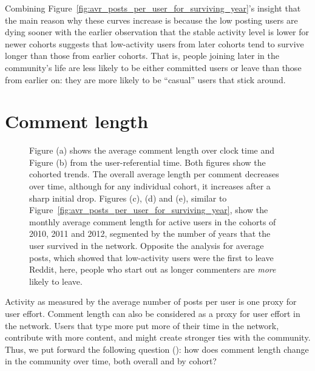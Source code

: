 Combining Figure~\ref{fig:avr_posts_per_user_for_surviving_year}'s insight that the main reason why these curves increase is because the low posting users are dying sooner with the earlier observation that the stable activity level is lower for newer cohorts suggests that low-activity users from later cohorts tend to survive longer than those from earlier cohorts.  That is, people joining later in the community's life are less likely to be either committed users or leave than those from earlier on: they are more likely to be ``casual'' users that stick around.

\vspace{7pt} 
\section{Comment length}

\begin{figure}[!tb]
\centering
{}
\caption{Figure (a) shows the average comment length over clock time and Figure (b) from the user-referential time. Both figures show the cohorted trends.  The overall average length per comment decreases over time, although for any individual cohort, it increases after a sharp initial drop. Figures (c), (d) and (e), similar to Figure~\ref{fig:avr_posts_per_user_for_surviving_year}, show the monthly average comment length for active users in the cohorts of 2010, 2011 and 2012, segmented by the number of years that the user survived in the network.  Opposite the analysis for average posts, which showed that low-activity users were the first to leave Reddit, here, people who start out as longer commenters are \textit{more} likely to leave.}
\label{fig:comment_length}
\end{figure}

Activity as measured by the average number of posts per user is one proxy for user effort.  Comment length can also be considered as a proxy for user effort in the network.  Users that type more put more of their time in the network, contribute with more content, and might create stronger ties with the community. Thus, we put forward the following question (\ResearchQuestion\label{rq:commentLengthOverTime}): how does comment length change in the community over time, both overall and by cohort?

